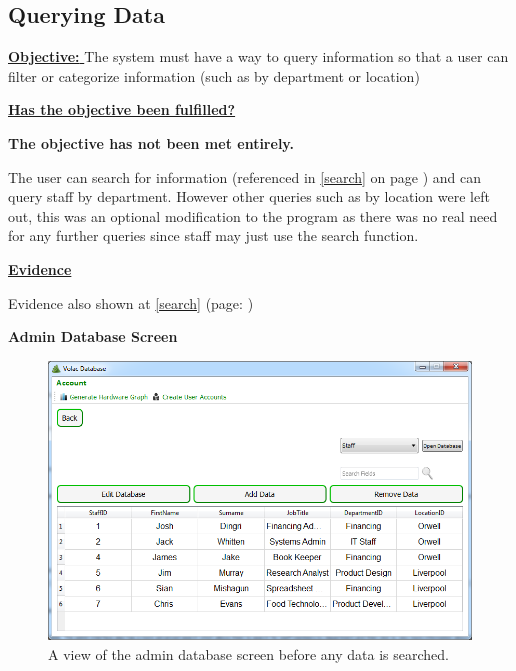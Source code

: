 \subsection{Querying Data}

\underline{\textbf{Objective:} } The system must have a way to query information so that a user can filter or categorize information (such as by department or location)

\underline{\textbf{Has the objective been fulfilled?}}

\textbf{The objective has not been met entirely.}

The user can search for information (referenced in \ref{search} on page \pageref{search}) and can query staff by department. However other queries such as by location were left out, this was an optional modification to the program as there was no real need for any further queries since staff may just use the search function.

\underline{\textbf{Evidence}}

Evidence also shown at \ref{search} (page: \pageref{search})

\textbf{Admin Database Screen}

\begin{figure}[H]
    \includegraphics[width=\textwidth]{./Evaluation/Images/beforeadminsearch.png}
    \caption{A view of the admin database screen before any data is searched.} 
\end{figure}

